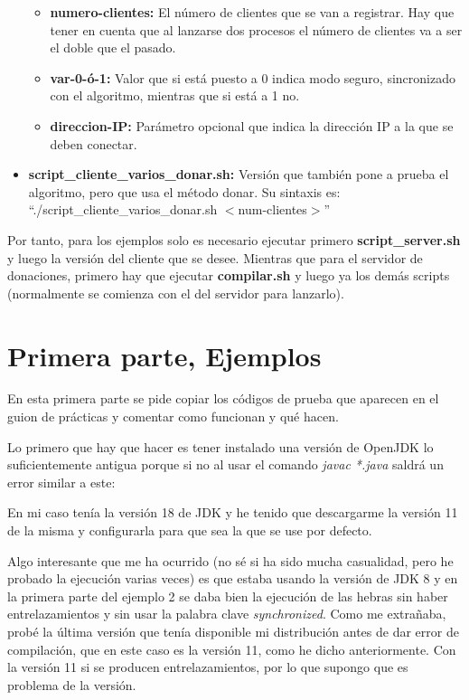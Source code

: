 \documentclass{article}
\begin{document}
\begin{itemize}
    \begin{itemize}
        \item \textbf{numero-clientes: }El número de clientes que se van a registrar. Hay que tener en cuenta que al lanzarse dos procesos el número de clientes va a ser el doble que el pasado.
        \item \textbf{var-0-ó-1: }Valor que si está puesto a 0 indica modo seguro, sincronizado con el algoritmo, mientras que si está a 1 no.
        \item \textbf{direccion-IP: }Parámetro opcional que indica la dirección IP a la que se deben conectar.
    \end{itemize}

    \item \textbf{script\_cliente\_varios\_donar.sh: }Versión que también pone a prueba el algoritmo, pero que usa el método donar. Su sintaxis es: ``./script\_cliente\_varios\_donar.sh $<$num-clientes$>$''
\end{itemize}

Por tanto, para los ejemplos solo es necesario ejecutar primero \textbf{script\_server.sh} y luego la versión del cliente que se desee. Mientras que para el servidor de donaciones, primero hay que ejecutar \textbf{compilar.sh} y luego ya los demás scripts (normalmente se comienza con el del servidor para lanzarlo).



\section{Primera parte, Ejemplos}
En esta primera parte se pide copiar los códigos de prueba que aparecen en el guion de prácticas y comentar como funcionan y qué hacen.

\bigskip

Lo primero que hay que hacer es tener instalado una versión de OpenJDK lo suficientemente antigua porque si no al usar el comando \textit{javac *.java} saldrá un error similar a este:


En mi caso tenía la versión 18 de JDK y he tenido que descargarme la versión 11 de la misma y configurarla para que sea la que se use por defecto.

\bigskip

Algo interesante que me ha ocurrido (no sé si ha sido mucha casualidad, pero he probado la ejecución varias veces) es que estaba usando la versión de JDK 8 y en la primera parte del ejemplo 2 se daba bien la ejecución de las hebras sin haber entrelazamientos y sin usar la palabra clave \textit{synchronized}. Como me extrañaba, probé la última versión que tenía disponible mi distribución antes de dar error de compilación, que en este caso es la versión 11, como he dicho anteriormente. Con la versión 11 si se producen entrelazamientos, por lo que supongo que es problema de la versión.
\end{document}
